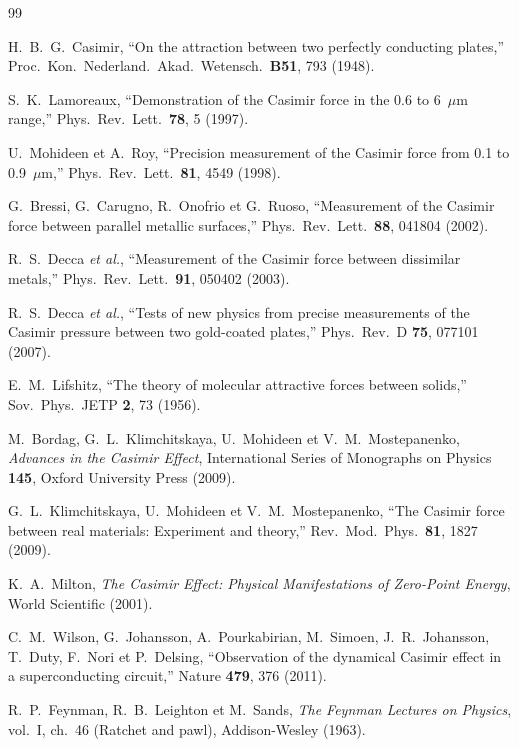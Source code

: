 \documentclass[11pt,a4paper]{article}
\begin{document}
\begin{thebibliography}{99}

H.~B.~G.~Casimir, ``On the attraction between two perfectly conducting plates,''
Proc.\ Kon.\ Nederland.\ Akad.\ Wetensch.\ \textbf{B51}, 793 (1948).

S.~K.~Lamoreaux, ``Demonstration of the Casimir force in the 0.6 to 6~$\mu$m range,''
Phys.\ Rev.\ Lett.\ \textbf{78}, 5 (1997).

U.~Mohideen et A.~Roy, ``Precision measurement of the Casimir force from 0.1 to 0.9~$\mu$m,''
Phys.\ Rev.\ Lett.\ \textbf{81}, 4549 (1998).

G.~Bressi, G.~Carugno, R.~Onofrio et G.~Ruoso,
``Measurement of the Casimir force between parallel metallic surfaces,''
Phys.\ Rev.\ Lett.\ \textbf{88}, 041804 (2002).

R.~S.~Decca \emph{et al.},
``Measurement of the Casimir force between dissimilar metals,''
Phys.\ Rev.\ Lett.\ \textbf{91}, 050402 (2003).

R.~S.~Decca \emph{et al.},
``Tests of new physics from precise measurements of the Casimir pressure between two
gold-coated plates,''
Phys.\ Rev.\ D \textbf{75}, 077101 (2007).

E.~M.~Lifshitz, ``The theory of molecular attractive forces between solids,''
Sov.\ Phys.\ JETP \textbf{2}, 73 (1956).

M.~Bordag, G.~L.~Klimchitskaya, U.~Mohideen et V.~M.~Mostepanenko,
\emph{Advances in the Casimir Effect}, International Series of Monographs on Physics
\textbf{145}, Oxford University Press (2009).

G.~L.~Klimchitskaya, U.~Mohideen et V.~M.~Mostepanenko,
``The Casimir force between real materials: Experiment and theory,''
Rev.\ Mod.\ Phys.\ \textbf{81}, 1827 (2009).

K.~A.~Milton, \emph{The Casimir Effect: Physical Manifestations of Zero-Point Energy},
World Scientific (2001).

C.~M.~Wilson, G.~Johansson, A.~Pourkabirian, M.~Simoen, J.~R.~Johansson, T.~Duty, F.~Nori et
P.~Delsing, ``Observation of the dynamical Casimir effect in a superconducting circuit,''
Nature \textbf{479}, 376 (2011).

R.~P.~Feynman, R.~B.~Leighton et M.~Sands,
\emph{The Feynman Lectures on Physics}, vol.~I, ch.~46 (Ratchet and pawl),
Addison-Wesley (1963).


\end{thebibliography}
\end{document}
